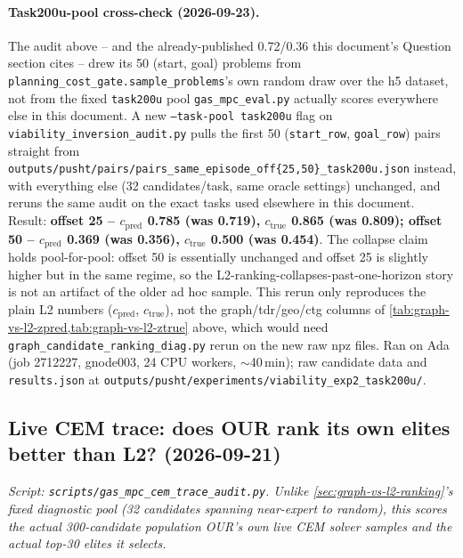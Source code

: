 \documentclass[11pt]{article}
\begin{document}
\paragraph{Task200u-pool cross-check (2026-09-23).} The audit above -- and the already-published
0.72/0.36 this document's Question section cites -- drew its 50 (start, goal) problems from
\texttt{planning\_cost\_gate.sample\_problems}'s own random draw over the h5 dataset, not from
the fixed \texttt{task200u} pool \texttt{gas\_mpc\_eval.py} actually scores everywhere else in
this document. A new \texttt{--task-pool task200u} flag on
\texttt{viability\_inversion\_audit.py} pulls the first 50 (\texttt{start\_row},
\texttt{goal\_row}) pairs straight from
\texttt{outputs/pusht/pairs/pairs\_same\_episode\_off\{25,50\}\_task200u.json} instead, with
everything else (32 candidates/task, same oracle settings) unchanged, and reruns the same
audit on the exact tasks used elsewhere in this document. Result: \textbf{offset 25 --
$c_{\mathrm{pred}}$ 0.785 (was 0.719), $c_{\mathrm{true}}$ 0.865 (was 0.809); offset 50 --
$c_{\mathrm{pred}}$ 0.369 (was 0.356), $c_{\mathrm{true}}$ 0.500 (was 0.454)}. The collapse claim
holds pool-for-pool: offset 50 is essentially unchanged and offset 25 is slightly higher but in
the same regime, so the L2-ranking-collapses-past-one-horizon story is not an artifact of the
older ad hoc sample. This rerun only reproduces the plain L2 numbers ($c_{\mathrm{pred}}$,
$c_{\mathrm{true}}$), not the graph/tdr/geo/ctg columns of
\cref{tab:graph-vs-l2-zpred,tab:graph-vs-l2-ztrue} above, which would need
\texttt{graph\_candidate\_ranking\_diag.py} rerun on the new raw npz files. Ran on Ada (job
2712227, gnode003, 24 CPU workers, $\sim$40\,min); raw candidate data and \texttt{results.json}
at \texttt{outputs/pusht/experiments/viability\_exp2\_task200u/}.

\subsection{Live CEM trace: does OUR rank its own elites better than L2? (2026-09-21)}
\label{sec:cem-trace-audit}
\emph{Script: \texttt{scripts/gas\_mpc\_cem\_trace\_audit.py}. Unlike
\cref{sec:graph-vs-l2-ranking}'s fixed diagnostic pool (32 candidates spanning near-expert to
random), this scores the actual 300-candidate population OUR's own live CEM solver samples
and the actual top-30 elites it selects.}
\end{document}
